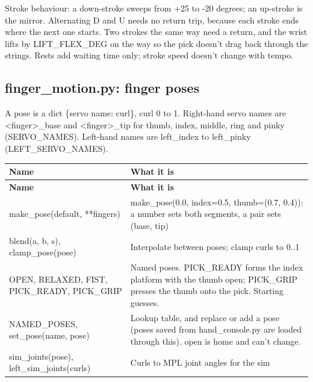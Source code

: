 \documentclass[11pt,letterpaper]{article}
\newcommand{\code}[1]{\textcolor{codeblue}{\ttfamily\smaller\relax #1}}
\begin{document}
Stroke behaviour: a down-stroke sweeps from +25 to -20 degrees; an up-stroke is the mirror. Alternating D and U needs no return trip, because each stroke ends where the next one starts. Two strokes the same way need a return, and the wrist lifts by \code{LIFT\_\allowbreak{}FLEX\_\allowbreak{}DEG} on the way so the pick doesn't drag back through the strings. Rests add waiting time only; stroke speed doesn't change with tempo.


\subsection{finger\_motion.py: finger poses}
A pose is a dict \code{\{servo name: curl\}}, curl 0 to 1. Right-hand servo names are \code{<finger>\_\allowbreak{}base} and \code{<finger>\_\allowbreak{}tip} for thumb, index, middle, ring and pinky (\code{SERVO\_\allowbreak{}NAMES}). Left-hand names are \code{left\_\allowbreak{}index} to \code{left\_\allowbreak{}pinky} (\code{LEFT\_\allowbreak{}SERVO\_\allowbreak{}NAMES}).

{\small
\begin{longtable}{|>{\raggedright\arraybackslash}p{}|>{\raggedright\arraybackslash}p{}|}
\hline
\rowcolor{tblhead}\textbf{Name} & \textbf{What it is} \\ \hline
\endfirsthead
\hline
\rowcolor{tblhead}\textbf{Name} & \textbf{What it is} \\ \hline
\endhead
\code{make\_\allowbreak{}pose(default,\allowbreak{} **fingers)} & \code{make\_\allowbreak{}pose(0.0,\allowbreak{} index=\allowbreak{}0.5,\allowbreak{} thumb=\allowbreak{}(0.7,\allowbreak{} 0.4))}: a number sets both segments, a pair sets (base, tip) \\ \hline
\code{blend(a,\allowbreak{} b,\allowbreak{} s)}, \code{clamp\_\allowbreak{}pose(pose)} & Interpolate between poses; clamp curls to 0..1 \\ \hline
\code{OPEN}, \code{RELAXED}, \code{FIST}, \code{PICK\_\allowbreak{}READY}, \code{PICK\_\allowbreak{}GRIP} & Named poses. \code{PICK\_\allowbreak{}READY} forms the index platform with the thumb open; \code{PICK\_\allowbreak{}GRIP} presses the thumb onto the pick. Starting guesses. \\ \hline
\code{NAMED\_\allowbreak{}POSES}, \code{set\_\allowbreak{}pose(name,\allowbreak{} pose)} & Lookup table, and replace or add a pose (poses saved from \code{hand\_\allowbreak{}console.py} are loaded through this). \code{open} is home and can't change. \\ \hline
\code{sim\_\allowbreak{}joints(pose)}, \code{left\_\allowbreak{}sim\_\allowbreak{}joints(curls)} & Curls to MPL joint angles for the sim \\ \hline
\end{longtable}}
\end{document}
